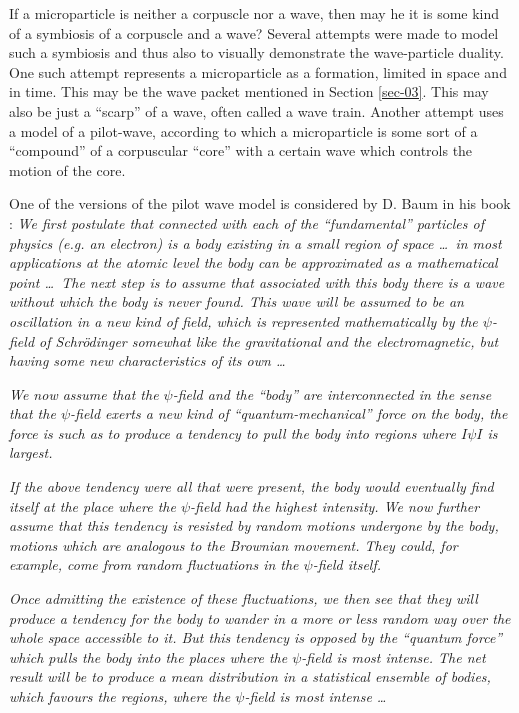 \documentclass[a4paper,sfsidenotes,colorlinks=true]{tufte-book}
\numberwithin{equation}{section}
\numberwithin{figure}{section}
\begin{document}
If  a microparticle is neither a corpuscle
nor a wave, then may he it is some kind of a symbiosis of a corpuscle
and a wave? Several attempts were made to model such a symbiosis and
thus also to visually demonstrate the wave-particle duality. One such
attempt represents a microparticle as a formation, limited in space
and in time. This may be the wave packet mentioned in Section
\ref{sec-03}. This may also be just a ``scarp'' of a wave, often called
a wave train. Another attempt uses a model of a pilot-wave, according
to which a microparticle is some sort of a ``compound'' of a corpuscular
``core'' with a certain wave which controls the motion of the core.

\begin{fullwidth}
  \setlength{\leftskip}{3cm} \textsf{\small One of the versions of the
    pilot wave model is considered by D. Baum in his book
    \cite[-1.5cm]{bohm-1957}:} \textit{\small We first postulate that
    connected with each of the ``fundamental'' particles of physics
    (e.g. an electron) is a body existing in a small region of space
    \ldots \, in most applications at the atomic level the body can be
    approximated as a mathematical point \ldots \, The next step is to
    assume that associated with this body there is a wave without
    which the body is never found. This wave will be assumed to be an
    oscillation in a new kind of field, which is represented
    mathematically by the $\psi$-field of Schr\"odinger somewhat like
    the gravitational and the electromagnetic, but having some new
    characteristics of its own \ldots }

  \textit{\small We now assume that the $\psi$-field and the ``body''
    are interconnected in the sense that the $\psi$-field exerts a new
    kind of ``quantum-mechanical'' force on the body, the force is
    such as to produce a tendency to pull the body into regions where
    $I\psi I$ is largest. }

  \textit{\small If the above tendency were all that were present, the
    body would eventually find itself at the place where the
    $\psi$-field had the highest intensity. We now further assume that
    this tendency is resisted by random motions undergone by the body,
    motions which are analogous to the Brownian movement. They could,
    for example, come from random fluctuations in the $\psi$-field
    itself.}

  \textit{\small Once admitting the existence of these fluctuations,
    we then see that they will produce a tendency for the body to
    wander in a more or less random way over the whole space
    accessible to it. But this tendency is opposed by the ``quantum
    force'' which pulls the body into the places where the $\psi$-field is
    most intense. The net result will be to produce a mean
    distribution in a statistical ensemble of bodies, which favours
    the regions, where the $\psi$-field is most intense \ldots}


\end{fullwidth}
\end{document}
